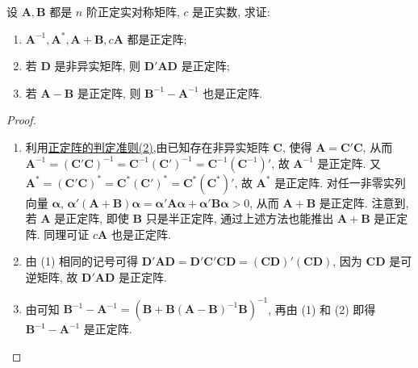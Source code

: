 \documentclass[../../main.tex]{subfiles}%
\begin{document}
\begin{proposition}\label{proposition:正定阵的性质123}
设 \(\boldsymbol{A},\boldsymbol{B}\) 都是 \(n\) 阶正定实对称矩阵, \(c\) 是正实数, 求证:
\begin{enumerate}[(1)]
\item \(\boldsymbol{A}^{-1},\boldsymbol{A}^*,\boldsymbol{A}+\boldsymbol{B},c\boldsymbol{A}\) 都是正定阵;
\item 若 \(\boldsymbol{D}\) 是非异实矩阵, 则 \(\boldsymbol{D}'\boldsymbol{A}\boldsymbol{D}\) 是正定阵;
\item 若 \(\boldsymbol{A}-\boldsymbol{B}\) 是正定阵, 则 \(\boldsymbol{B}^{-1}-\boldsymbol{A}^{-1}\) 也是正定阵.
\end{enumerate}
\end{proposition}
\begin{proof}
\begin{enumerate}[(1)]
\item 利用\hyperref[theorem:正定阵的判定准则]{正定阵的判定准则(2)},由已知存在非异实矩阵 \(\boldsymbol{C}\), 使得 \(\boldsymbol{A}=\boldsymbol{C}'\boldsymbol{C}\), 从而 \(\boldsymbol{A}^{-1}=(\boldsymbol{C}'\boldsymbol{C})^{-1}=\boldsymbol{C}^{-1}(\boldsymbol{C}')^{-1}=\boldsymbol{C}^{-1}(\boldsymbol{C}^{-1})'\), 故 \(\boldsymbol{A}^{-1}\) 是正定阵. 又 \(\boldsymbol{A}^*=(\boldsymbol{C}'\boldsymbol{C})^*=\boldsymbol{C}^*(\boldsymbol{C}')^*=\boldsymbol{C}^*(\boldsymbol{C}^*)'\), 故 \(\boldsymbol{A}^*\) 是正定阵. 对任一非零实列向量 \(\boldsymbol{\alpha}\), \(\boldsymbol{\alpha}'(\boldsymbol{A}+\boldsymbol{B})\boldsymbol{\alpha}=\boldsymbol{\alpha}'\boldsymbol{A}\boldsymbol{\alpha}+\boldsymbol{\alpha}'\boldsymbol{B}\boldsymbol{\alpha}>0\), 从而 \(\boldsymbol{A}+\boldsymbol{B}\) 是正定阵. 注意到, 若 \(\boldsymbol{A}\) 是正定阵, 即使 \(\boldsymbol{B}\) 只是半正定阵, 通过上述方法也能推出 \(\boldsymbol{A}+\boldsymbol{B}\) 是正定阵. 同理可证 \(c\boldsymbol{A}\) 也是正定阵.
\item 由 (1) 相同的记号可得 \(\boldsymbol{D}'\boldsymbol{A}\boldsymbol{D}=\boldsymbol{D}'\boldsymbol{C}'\boldsymbol{C}\boldsymbol{D}=(\boldsymbol{C}\boldsymbol{D})'(\boldsymbol{C}\boldsymbol{D})\), 因为 \(\boldsymbol{C}\boldsymbol{D}\) 是可逆矩阵, 故 \(\boldsymbol{D}'\boldsymbol{A}\boldsymbol{D}\) 是正定阵. 
\item 由可知 \(\boldsymbol{B}^{-1}-\boldsymbol{A}^{-1}=(\boldsymbol{B}+\boldsymbol{B}(\boldsymbol{A}-\boldsymbol{B})^{-1}\boldsymbol{B})^{-1}\), 再由 (1) 和 (2) 即得 \(\boldsymbol{B}^{-1}-\boldsymbol{A}^{-1}\) 是正定阵. 
\end{enumerate}

\end{proof}
\end{document}
